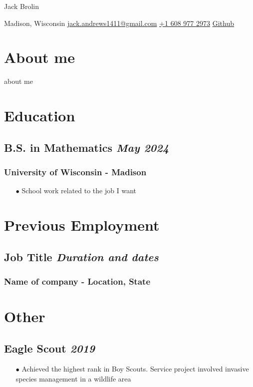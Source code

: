 \documentclass[11pt]{article}
\begin{document}
\begin{center}      
    {\fontsize{20}{20}\selectfont Jack Brolin} \\ \bigskip

    {\color{icnclr}\faMapMarker} Madison, Wisconsin\quad 
    {\color{icnclr}\faEnvelope[regular]} \href{mailto:myaname@email.com}{jack.andrews1411@gmail.com} \quad
    {\color{icnclr}} \href{tel:+920000000000}{+1 608 977 2973} \newline
    {\color{icnclr}\faGithub} \href{https://github.com/draco1411}{Github}
    
\end{center}
\section{About me}
about me
 
\section{Education}
\subsection{B.S. in Mathematics \hfill \normalfont \textit{May 2024}}
\subsubsection{University of Wisconsin - Madison}
\begin{itemize}
    \item [$\bullet$] School work related to the job I want 
\end{itemize}

\section{Previous Employment}
\subsection{Job Title \hfill \normalfont \textit{Duration and dates}} %
\subsubsection{Name of company - Location, State} %


\section{Other}
\subsection{Eagle Scout \hfill \normalfont \textit{2019}}
\begin{itemize}
    \item [$\bullet$] Achieved the highest rank in Boy Scouts. Service project involved invasive species management in a
        wildlife area
\end{itemize}
\end{document}
